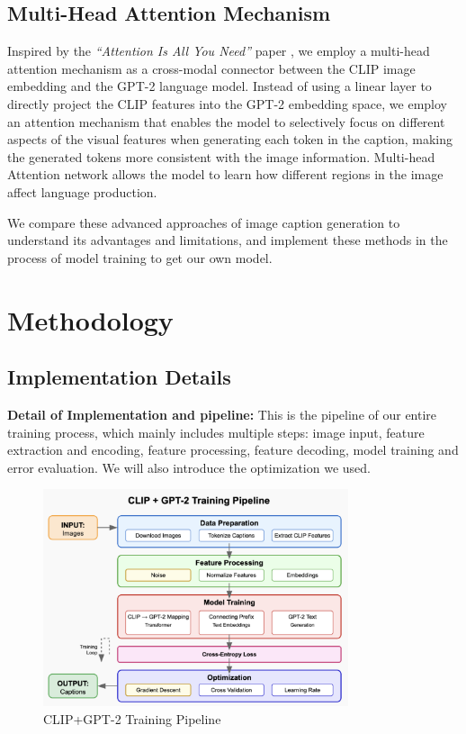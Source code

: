 \documentclass[11pt]{article}
\begin{document}
    \subsection{Multi-Head Attention Mechanism}
    Inspired by the \textit{``Attention Is All You Need''} paper 
    \cite{vaswani2017attention}, we employ a multi-head attention 
    mechanism as a cross-modal connector between the CLIP image embedding
    and the GPT-2 language model. Instead of using a linear layer to directly 
    project the CLIP features into the GPT-2 embedding space, we employ an 
    attention mechanism that enables the model to selectively focus on 
    different aspects of the visual features when generating each token 
    in the caption, making the generated tokens more consistent with the 
    image information. Multi-head Attention network allows the model to 
    learn how different regions in the image affect language production.

We compare these advanced approaches of image caption generation to understand its 
advantages and limitations, and implement these methods in the process of model training to get our own model.
\pagebreak
\section{Methodology}

\subsection{Implementation Details}
\textbf{Detail of Implementation and pipeline:} This is the pipeline of 
our entire training process, which mainly includes multiple steps: 
image input, feature extraction and encoding, feature processing, 
feature decoding, model training and error evaluation. We will also 
introduce the optimization we used.

\begin{figure}[h]
    \centering
    \includegraphics[width=0.8\textwidth]{figure1.png}
    \caption{CLIP+GPT-2 Training Pipeline}
    \label{fig:architecture}
    \end{figure}
\end{document}
